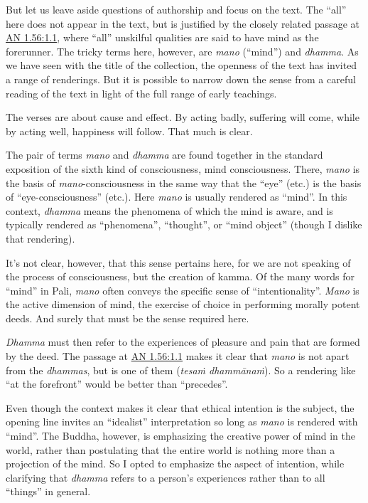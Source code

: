 \documentclass[12pt,openany]{book}%
\begin{document}
But let us leave aside questions of authorship and focus on the text. The “all” here does not appear in the text, but is justified by the closely related passage at \href{https://suttacentral.net/an1.56/en/sujato\#1.1}{AN 1.56:1.1}, where “all” unskilful qualities are said to have mind as the forerunner. The tricky terms here, however, are \textit{mano} (“mind”) and \textit{dhamma}. As we have seen with the title of the collection, the openness of the text has invited a range of renderings. But it is possible to narrow down the sense from a careful reading of the text in light of the full range of early teachings.

The verses are about cause and effect. By acting badly, suffering will come, while by acting well, happiness will follow. That much is clear.

The pair of terms \textit{mano} and \textit{dhamma} are found together in the standard exposition of the sixth kind of consciousness, mind consciousness. There, \textit{mano} is the basis of \textit{mano}-consciousness in the same way that the “eye” (etc.) is the basis of “eye-consciousness” (etc.). Here \textit{mano} is usually rendered as “mind”. In this context, \textit{dhamma} means the phenomena of which the mind is aware, and is typically rendered as “phenomena”, “thought”, or “mind object” (though I dislike that rendering).

It’s not clear, however, that this sense pertains here, for we are not speaking of the process of consciousness, but the creation of kamma. Of the many words for “mind” in Pali, \textit{mano} often conveys the specific sense of “intentionality”. \textit{Mano} is the active dimension of mind, the exercise of choice in performing morally potent deeds. And surely that must be the sense required here.

\textit{Dhamma} must then refer to the experiences of pleasure and pain that are formed by the deed. The passage at \href{https://suttacentral.net/an1.56/en/sujato\#1.1}{AN 1.56:1.1} makes it clear that \textit{mano} is not apart from the \textit{dhammas}, but is one of them (\textit{\textsanskrit{tesaṁ} \textsanskrit{dhammānaṁ}}). So a rendering like “at the forefront” would be better than “precedes”.

Even though the context makes it clear that ethical intention is the subject, the opening line invites an “idealist” interpretation so long as \textit{mano} is rendered with “mind”. The Buddha, however, is emphasizing the creative power of mind in the world, rather than postulating that the entire world is nothing more than a projection of the mind. So I opted to emphasize the aspect of intention, while clarifying that \textit{dhamma} refers to a person’s experiences rather than to all “things” in general.
\end{document}
